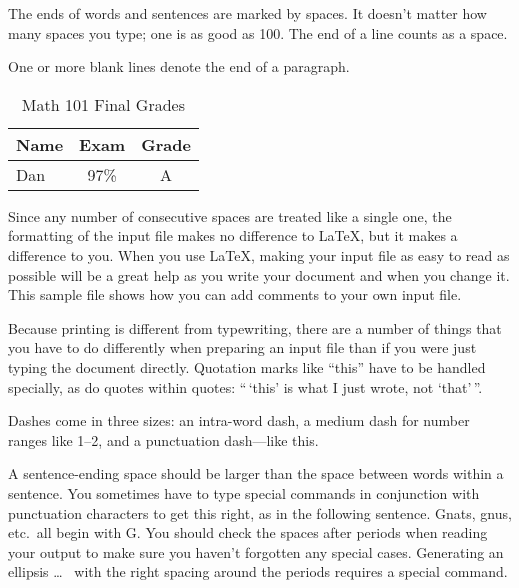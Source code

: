\documentclass{article}      %
\begin{document}
\begin{CJK}{UTF8}{gkai}
The ends  of words and sentences are marked 
  by   spaces. It  doesn't matter how many 
spaces    you type; one is as good as 100.  The
end of   a line counts as a space.

One   or more   blank lines denote the  end 
of  a paragraph.  

\begin{table}
\begin{center}
\begin{tabular}{|l|c|c|} \hline
Name & Exam & Grade \\ \hline
Dan & 97\% & A \\ \hline
\end{tabular}
\caption{Math 101 Final Grades}
\label{GradeTable}
\end{center}
\end{table}



Since any number of consecutive spaces are treated
like a single one, the formatting of the input
file makes no difference to
      \LaTeX,                %
but it makes a difference to you.  When you use
\LaTeX, making your input file as easy to read 
as possible will be a great help as you write 
your document and when you change it.  This sample 
file shows how you can add comments to your own input 
file.

Because printing is different from typewriting,
there are a number of things that you have to do
differently when preparing an input file than if
you were just typing the document directly.
Quotation marks like
       ``this'' 
have to be handled specially, as do quotes within
quotes:
       ``\,`this'            %
        is what I just 
        wrote, not  `that'\,''.  

Dashes come in three sizes: an 
       intra-word 
dash, a medium dash for number ranges like 
       1--2, 
and a punctuation 
       dash---like 
this.

A sentence-ending space should be larger than the
space between words within a sentence.  You
sometimes have to type special commands in
conjunction with punctuation characters to get
this right, as in the following sentence.
       Gnats, gnus, etc.\ all  %
       begin with G\@.         %
You should check the spaces after periods when
reading your output to make sure you haven't
forgotten any special cases.  Generating an
ellipsis
       \ldots\               %
with the right spacing around the periods requires
a special command.


\end{CJK}
\end{document}
